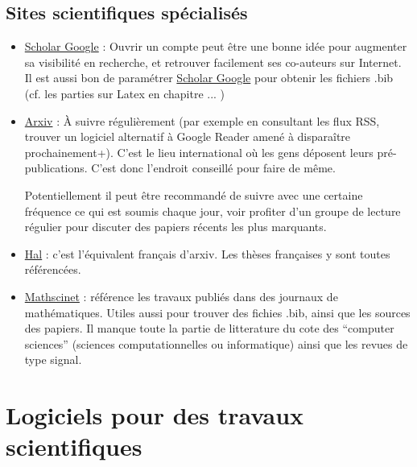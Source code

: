 \documentclass[a4paper,10pt]{article}
\begin{document}
\subsection{Sites scientifiques spécialisés}



\begin{itemize}
\item \href{http://scholar.google.com}{Scholar Google} :
Ouvrir un compte peut être une bonne idée pour augmenter sa visibilité en recherche,
et retrouver facilement ses co-auteurs sur Internet.
Il est aussi bon de paramétrer \href{http://scholar.google.com}{Scholar Google} pour
obtenir les fichiers  .bib (cf. les parties sur Latex en chapitre ... )

\item \href{http://arxiv.org/}{Arxiv} :
À suivre régulièrement (par exemple en consultant les flux RSS, trouver un logiciel alternatif
à Google Reader amené à disparaître prochainement+). C'est le lieu international
où les gens déposent leurs pré-publications. C'est donc l'endroit conseillé pour faire
de même.

Potentiellement il peut être recommandé de suivre avec une certaine fréquence ce qui est soumis
chaque jour, voir profiter d'un groupe de lecture régulier pour discuter des papiers récents les plus
marquants.

\item \href{http://hal.archives-ouvertes.fr/}{Hal} : c'est l'équivalent français d'arxiv.
Les thèses françaises y sont toutes référencées.


\item \href{http://www.ams.org/mathscinet/}{Mathscinet} : référence les travaux publiés dans
des journaux de mathématiques. Utiles aussi pour trouver des fichies .bib, ainsi que les sources
des papiers. Il manque toute la partie de litterature du cote des ``computer sciences'' (sciences
computationnelles ou informatique) ainsi que les revues de type signal.

\end{itemize}



\section{Logiciels pour des  travaux scientifiques}
\end{document}
